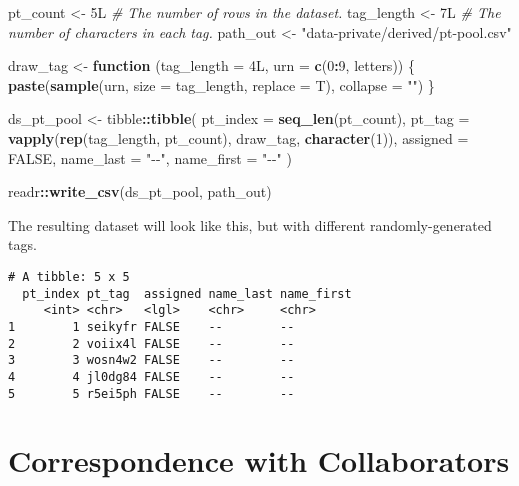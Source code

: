 \documentclass[
]{book}
\newenvironment{Shaded}{\begin{snugshade}}{\end{snugshade}}
\newcommand{\CommentTok}[1]{\textcolor[rgb]{0.56,0.35,0.01}{\textit{#1}}}
\newcommand{\ControlFlowTok}[1]{\textcolor[rgb]{0.13,0.29,0.53}{\textbf{#1}}}
\newcommand{\DataTypeTok}[1]{\textcolor[rgb]{0.13,0.29,0.53}{#1}}
\newcommand{\DecValTok}[1]{\textcolor[rgb]{0.00,0.00,0.81}{#1}}
\newcommand{\KeywordTok}[1]{\textcolor[rgb]{0.13,0.29,0.53}{\textbf{#1}}}
\newcommand{\NormalTok}[1]{#1}
\newcommand{\OperatorTok}[1]{\textcolor[rgb]{0.81,0.36,0.00}{\textbf{#1}}}
\newcommand{\OtherTok}[1]{\textcolor[rgb]{0.56,0.35,0.01}{#1}}
\newcommand{\StringTok}[1]{\textcolor[rgb]{0.31,0.60,0.02}{#1}}
\begin{document}
\begin{Shaded}
\begin{Highlighting}[]
\NormalTok{pt\_count    <{-}}\StringTok{ }\NormalTok{5L   }\CommentTok{\# The number of rows in the dataset.}
\NormalTok{tag\_length  <{-}}\StringTok{ }\NormalTok{7L   }\CommentTok{\# The number of characters in each tag.}
\NormalTok{path\_out    <{-}}\StringTok{ "data{-}private/derived/pt{-}pool.csv"}

\NormalTok{draw\_tag <{-}}\StringTok{ }\ControlFlowTok{function}\NormalTok{ (}\DataTypeTok{tag\_length =}\NormalTok{ 4L, }\DataTypeTok{urn =} \KeywordTok{c}\NormalTok{(}\DecValTok{0}\OperatorTok{:}\DecValTok{9}\NormalTok{, letters)) \{}
  \KeywordTok{paste}\NormalTok{(}\KeywordTok{sample}\NormalTok{(urn, }\DataTypeTok{size =}\NormalTok{ tag\_length, }\DataTypeTok{replace =}\NormalTok{ T), }\DataTypeTok{collapse =} \StringTok{""}\NormalTok{)}
\NormalTok{\}}

\NormalTok{ds\_pt\_pool <{-}}
\StringTok{  }\NormalTok{tibble}\OperatorTok{::}\KeywordTok{tibble}\NormalTok{(}
    \DataTypeTok{pt\_index    =} \KeywordTok{seq\_len}\NormalTok{(pt\_count),}
    \DataTypeTok{pt\_tag      =} \KeywordTok{vapply}\NormalTok{(}\KeywordTok{rep}\NormalTok{(tag\_length, pt\_count), draw\_tag, }\KeywordTok{character}\NormalTok{(}\DecValTok{1}\NormalTok{)),}
    \DataTypeTok{assigned    =} \OtherTok{FALSE}\NormalTok{,}
    \DataTypeTok{name\_last   =} \StringTok{"{-}{-}"}\NormalTok{,}
    \DataTypeTok{name\_first  =} \StringTok{"{-}{-}"}
\NormalTok{  )}

\NormalTok{readr}\OperatorTok{::}\KeywordTok{write\_csv}\NormalTok{(ds\_pt\_pool, path\_out)}
\end{Highlighting}
\end{Shaded}

The resulting dataset will look like this, but with different randomly-generated tags.

\begin{verbatim}
# A tibble: 5 x 5
  pt_index pt_tag  assigned name_last name_first
     <int> <chr>   <lgl>    <chr>     <chr>
1        1 seikyfr FALSE    --        --
2        2 voiix4l FALSE    --        --
3        3 wosn4w2 FALSE    --        --
4        4 jl0dg84 FALSE    --        --
5        5 r5ei5ph FALSE    --        --
\end{verbatim}

\hypertarget{snippets-correspondence}{%
\section{Correspondence with Collaborators}\label{snippets-correspondence}}
\end{document}
